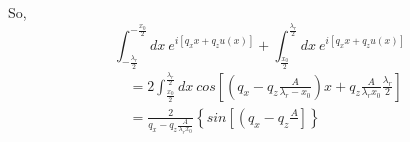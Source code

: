 \documentclass[letterpage]{article}
\begin{document}
So,
\begin{equation}
  \int_{-\frac{\lambda_r}{2}}^{-\frac{x_0}{2}} dx \:
  e^{i{\left[q_xx+q_zu(x)\right]}}
  + \int_{\frac{x_0}{2}}^{\frac{\lambda_r}{2}} dx \: 
  e^{i\left[q_xx+q_zu(x)\right]}
\end{equation}
\begin{align}
  &=2 \int_{\frac{x_0}{2}}^{\frac{\lambda_r}{2}} dx \: cos 
  \left[\left(q_x - q_z \frac{A}{\lambda_r - x_0}\right)x
  + q_z \frac{A}{\lambda_r x_0} \frac{\lambda_r}{2} \right]\\
  &= \frac{2}{q_x - q_z \frac{A}{\lambda_r x_0}} \left\{sin\left[\left(
  q_x-q_z\frac{A}{} \right] \right\}
\end{align}
\end{document}
